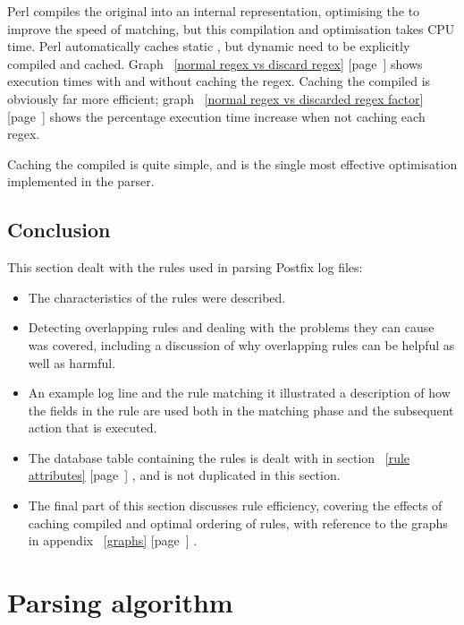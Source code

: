 \documentclass[a4paper,12pt,draft]{article}
\newcommand{\refwithpage}[1]{%
    \empty{}\ref{#1} [page~\pageref{#1}]%
}
\begin{document}
Perl compiles the original \regex{} into an internal representation,
optimising the \regex{} to improve the speed of matching, but this
compilation and optimisation takes CPU time.  Perl automatically caches
static \regexs{}, but dynamic \regexs{} need to be explicitly compiled and
cached.  Graph~\refwithpage{normal regex vs discard regex} shows execution
times with and without caching the regex.  Caching the compiled \regexs{}
is obviously far more efficient; graph~\refwithpage{normal regex vs
discarded regex factor} shows the percentage execution time increase when
not caching each regex.

Caching the compiled \regexs{} is quite simple, and is the single most
effective optimisation implemented in the parser.

\subsection{Conclusion}

This section dealt with the rules used in parsing Postfix log files:

\begin{itemize}

    \item The characteristics of the rules were described.

    \item Detecting overlapping rules and dealing with the problems they
        can cause was covered, including a discussion of why overlapping
        rules can be helpful as well as harmful.

    \item An example log line and the rule matching it illustrated a
        description of how the fields in the rule are used both in the
        matching phase and the subsequent action that is executed.

    \item The database table containing the rules is dealt with in
        section~\refwithpage{rule attributes}, and is not duplicated in
        this section.

    \item The final part of this section discusses rule efficiency,
        covering the effects of caching compiled \regexs{} and optimal
        ordering of rules, with reference to the graphs in
        appendix~\refwithpage{graphs}.

\end{itemize}

\section{Parsing algorithm}
\end{document}
